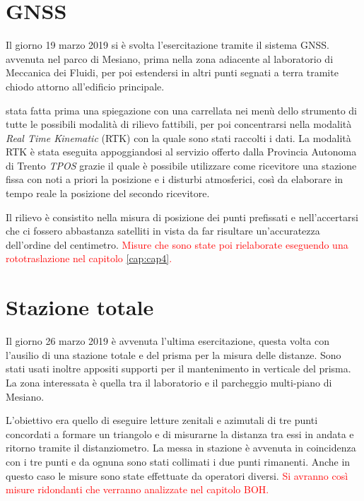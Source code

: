 \section{GNSS}
Il giorno 19 marzo 2019 si è svolta l'esercitazione tramite il sistema GNSS. \e avvenuta nel parco di Mesiano, prima nella zona adiacente al laboratorio di Meccanica dei Fluidi, per poi estendersi in altri punti segnati a terra tramite chiodo attorno all'edificio principale.

\e stata fatta prima una spiegazione con una carrellata nei menù dello strumento di tutte le possibili modalità di rilievo fattibili, per poi concentrarsi nella modalità \emph{Real Time Kinematic} (RTK) con la quale sono stati raccolti i dati.
La modalità RTK è stata eseguita appoggiandosi al servizio offerto dalla Provincia Autonoma di Trento \emph{TPOS} grazie il quale è possibile utilizzare come ricevitore una stazione fissa con noti a priori la posizione e i disturbi atmosferici, così da elaborare in tempo reale la posizione del secondo ricevitore.

Il rilievo è consistito nella misura di posizione dei punti prefissati e nell'accertarsi che ci fossero abbastanza satelliti in vista da far risultare un'accuratezza dell'ordine del centimetro. 
\textcolor{red}{Misure che sono state poi rielaborate eseguendo una rototraslazione nel capitolo \ref{cap:cap4}.}
\section{Stazione totale}
Il giorno 26 marzo 2019 è avvenuta l'ultima esercitazione, questa volta con l'ausilio di una stazione totale e del prisma per la misura delle distanze. 
Sono stati usati inoltre appositi supporti per il mantenimento in verticale del prisma.
La zona interessata è quella tra il laboratorio e il parcheggio multi-piano di Mesiano. 

L'obiettivo era quello di eseguire letture zenitali e azimutali di tre punti concordati a formare un triangolo e di misurarne la distanza tra essi in andata e ritorno tramite il distanziometro. 
La messa in stazione è avvenuta in coincidenza con i tre punti e da ognuna sono stati collimati i due punti rimanenti. 
Anche in questo caso le misure sono state effettuate da operatori diversi. 
\textcolor{red}{Si avranno così misure ridondanti che verranno analizzate nel capitolo BOH.}